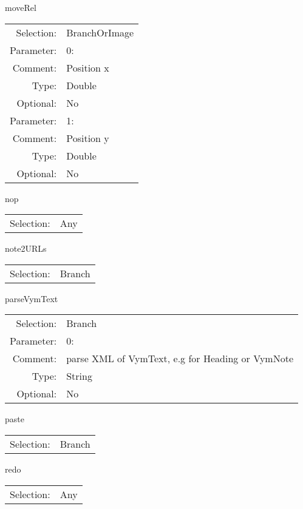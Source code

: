 \item moveRel\\
\begin{tabular}{rl}
  Selection: & BranchOrImage\\
   Parameter: &  0:\\
        Comment: & Position x\\
           Type: & Double\\
       Optional: &  No\\
   Parameter: &  1:\\
        Comment: & Position y\\
           Type: & Double\\
       Optional: &  No\\
\end{tabular}

\item nop\\
\begin{tabular}{rl}
  Selection: & Any\\
\end{tabular}

\item note2URLs\\
\begin{tabular}{rl}
  Selection: & Branch\\
\end{tabular}

\item parseVymText\\
\begin{tabular}{rl}
  Selection: & Branch\\
   Parameter: &  0:\\
        Comment: & parse XML of VymText, e.g for Heading or VymNote\\
           Type: & String\\
       Optional: &  No\\
\end{tabular}

\item paste\\
\begin{tabular}{rl}
  Selection: & Branch\\
\end{tabular}

\item redo\\
\begin{tabular}{rl}
  Selection: & Any\\
\end{tabular}

